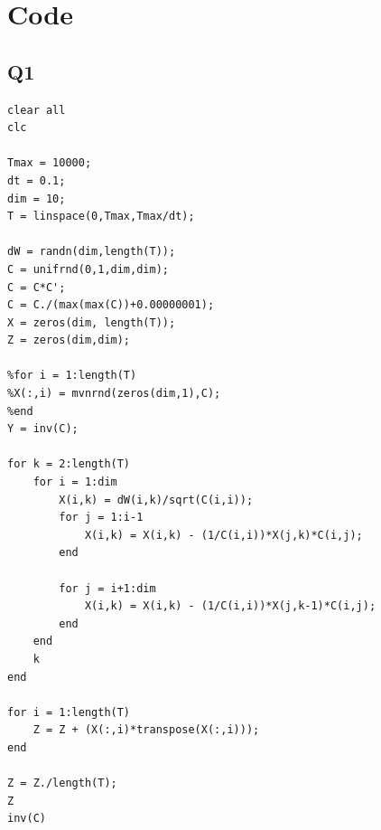 \documentclass[11pt]{article} %
\begin{document}
\section{Code}
\subsection{Q1}
\begin{verbatim}clear all
clc

Tmax = 10000;
dt = 0.1;
dim = 10;
T = linspace(0,Tmax,Tmax/dt);

dW = randn(dim,length(T));
C = unifrnd(0,1,dim,dim);
C = C*C';
C = C./(max(max(C))+0.00000001);
X = zeros(dim, length(T));
Z = zeros(dim,dim);

%for i = 1:length(T)
%X(:,i) = mvnrnd(zeros(dim,1),C);
%end
Y = inv(C);

for k = 2:length(T)
    for i = 1:dim
        X(i,k) = dW(i,k)/sqrt(C(i,i));
        for j = 1:i-1
            X(i,k) = X(i,k) - (1/C(i,i))*X(j,k)*C(i,j);
        end
        
        for j = i+1:dim
            X(i,k) = X(i,k) - (1/C(i,i))*X(j,k-1)*C(i,j);
        end
    end
    k
end

for i = 1:length(T)
    Z = Z + (X(:,i)*transpose(X(:,i)));
end

Z = Z./length(T);
Z
inv(C)
\end{verbatim}
\end{document}
